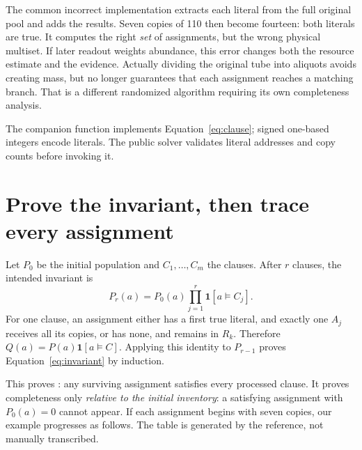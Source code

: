 The common incorrect implementation extracts each literal from the full
original pool and adds the results. Seven copies of 110 then become
fourteen: both literals are true. It computes the right \emph{set} of
assignments, but the wrong physical multiset. If later readout weights
abundance, this error changes both the resource estimate and the evidence.
Actually dividing the original tube into aliquots avoids creating mass,
but no longer guarantees that each assignment reaches a matching branch.
That is a different randomized algorithm requiring its own completeness
analysis.

The companion function implements Equation~\ref{eq:clause}; signed
one-based integers encode literals. The public solver validates literal
addresses and copy counts before invoking it.

\section{Prove the invariant, then trace every assignment}
Let $P_0$ be the initial population and $C_1,\ldots,C_m$ the clauses.
After $r$ clauses, the intended invariant is
\begin{equation}
 P_r(a)=P_0(a)\prod_{j=1}^{r}\mathbf1[a\models C_j].
 \label{eq:invariant}
\end{equation}
For one clause, an assignment either has a first true literal, and exactly
one $A_j$ receives all its copies, or has none, and remains in $R_k$.
Therefore $Q(a)=P(a)\mathbf1[a\models C]$. Applying this identity to
$P_{r-1}$ proves Equation~\ref{eq:invariant} by induction.

This proves : any surviving assignment satisfies every
processed clause. It proves completeness only \emph{relative to the initial
inventory}: a satisfying assignment with $P_0(a)=0$ cannot appear.
If each assignment begins with seven copies, our example progresses as
follows. The table is generated by the reference, not manually transcribed.

\begin{center}\end{center}


